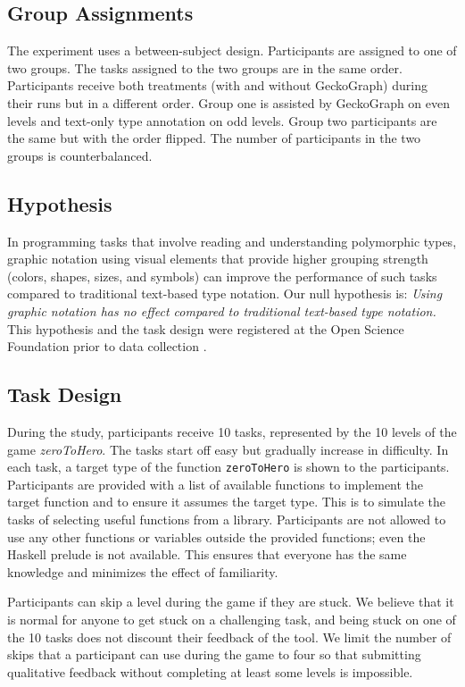 \documentclass[preprint,12pt]{elsarticle}
\begin{document}
\subsection{Group Assignments}

The experiment uses a between-subject design. Participants are assigned to one of two groups. The tasks assigned to the two groups are in the same order. Participants receive both treatments (with and without GeckoGraph) during their runs but in a different order.   Group one is assisted by GeckoGraph on even levels and text-only type annotation on odd levels. Group two participants are the same but with the order flipped. The number of participants in the two groups is counterbalanced.

\subsection{Hypothesis}
In programming tasks that involve reading and understanding polymorphic types, graphic notation using visual elements that provide higher grouping strength (colors, shapes, sizes, and symbols) can improve the performance of such tasks compared to traditional text-based type notation. Our null hypothesis is: {\it Using graphic notation has no effect compared to traditional text-based type notation.} This hypothesis and the task design were registered at the Open Science Foundation prior to data collection \cite{Stuckey2023-vl}. 

\subsection{Task Design} \label{subsection:task}
During the study, participants receive 10 tasks, represented by the 10 levels of the game {\it zeroToHero}. The tasks start off easy but gradually increase in difficulty.  In each task, a target type of the function \texttt{zeroToHero} is shown to the participants. Participants are provided with a list of available functions to implement the target function and to ensure it assumes the target type. This is to simulate the tasks of selecting useful functions from a library. Participants are not allowed to use any other functions or variables outside the provided functions; even the Haskell prelude is not available. This ensures that everyone has the same knowledge and minimizes the effect of familiarity. 

Participants can skip a level during the game if they are stuck. We believe that it is normal for anyone to get stuck on a challenging task, and being stuck on one of the 10 tasks does not discount their feedback of the tool. We limit the number of skips that a participant can use during the game to four so that submitting qualitative feedback without completing at least some levels is impossible. 
\end{document}
